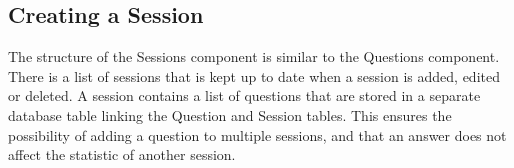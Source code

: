 \subsection{Creating a Session}
The structure of the Sessions component is similar to the Questions component. There is a list of sessions that is kept up to date when a session is added, edited or deleted. A session contains a list of questions that are stored in a separate database table linking the Question and Session tables. This ensures the possibility of adding a question to multiple sessions, and that an answer does not affect the statistic of another session.